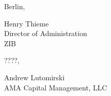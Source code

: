 \documentclass[12pt,a4paper]{article}
\begin{document}
\bigskip
\begin{minipage}[t]{0.45\textwidth}
Berlin, \underline{\hspace{4cm}}
\bigskip

Henry Thieme\\
Director of Administration\\
ZIB
\end{minipage}
\hfill
\begin{minipage}[t]{0.45\textwidth}
????, \underline{\hspace{3cm}}
\bigskip

Andrew Lutomirski\\
AMA Capital Management, LLC
\end{minipage}
\end{document}
